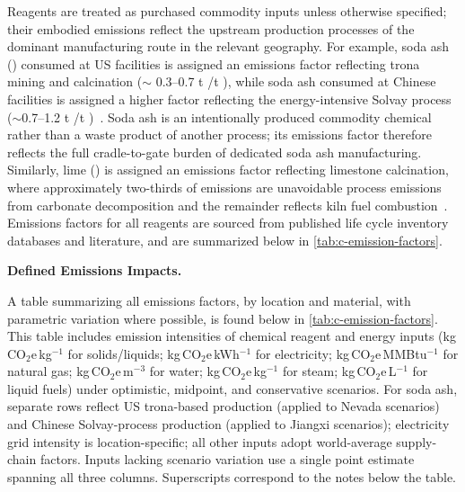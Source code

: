 Reagents are treated as purchased commodity inputs unless otherwise specified; their embodied emissions reflect the upstream production processes of the dominant manufacturing route in the relevant geography. For example, soda ash () consumed at US facilities is assigned an emissions factor reflecting trona mining and calcination ($\sim$ 0.3--0.7 t /t ), while soda ash consumed at Chinese facilities is assigned a higher factor reflecting the energy-intensive Solvay process ($\sim$0.7--1.2 t /t )~\cite{wangGreenhouseGasesRegulated2024, scottCanSyntheticSoda2023, royLithiumClayAssessing2024}. Soda ash is an intentionally produced commodity chemical rather than a waste product of another process; its emissions factor therefore reflects the full cradle-to-gate burden of dedicated soda ash manufacturing. Similarly, lime () is assigned an emissions factor reflecting limestone calcination, where approximately two-thirds of emissions are unavoidable process emissions from carbonate decomposition and the remainder reflects kiln fuel combustion~\cite{lavegliaDecarbonizingLimebasedConstruction2023}. Emissions factors for all reagents are sourced from published life cycle inventory databases and literature, and are summarized below in \ref{tab:c-emission-factors}.

\medskip
\noindent\textbf{Defined Emissions Impacts.}\quad

A table summarizing all emissions factors, by location and material, with parametric variation where possible, is found below in \ref{tab:c-emission-factors}. This table includes emission intensities of chemical reagent and energy inputs (kg\,CO$_2$e\,kg$^{-1}$ for solids/liquids; kg\,CO$_2$e\,kWh$^{-1}$ for electricity; kg\,CO$_2$e\,MMBtu$^{-1}$ for natural gas; kg\,CO$_2$e\,m$^{-3}$ for water; kg\,CO$_2$e\,kg$^{-1}$ for steam; kg\,CO$_2$e\,L$^{-1}$ for liquid fuels) under optimistic, midpoint, and conservative scenarios. For soda ash, separate rows reflect US trona-based production (applied to Nevada scenarios) and Chinese Solvay-process production (applied to Jiangxi scenarios); electricity grid intensity is location-specific; all other inputs adopt world-average supply-chain factors. Inputs lacking scenario variation use a single point estimate spanning all three columns. Superscripts correspond to the notes below the table.


